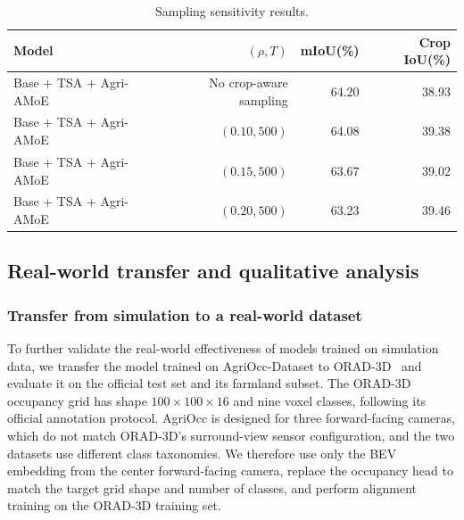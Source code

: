 \documentclass[a4paper,fleqn]{cas-sc}
\begin{document}
\begin{table}[pos=htbp]
\centering
\caption{Sampling sensitivity results.}
\label{tab:sampling}
\begin{tabular}{lrrr}
\toprule
Model & $(\rho,T)$ & mIoU(\%) & Crop IoU(\%)\\
\midrule
Base + TSA + Agri-AMoE & No crop-aware sampling & 64.20 & 38.93\\
Base + TSA + Agri-AMoE & $(0.10,500)$ & 64.08 & 39.38\\
Base + TSA + Agri-AMoE & $(0.15,500)$ & 63.67 & 39.02\\
Base + TSA + Agri-AMoE & $(0.20,500)$ & 63.23 & 39.46\\
\bottomrule
\end{tabular}
\end{table}

\subsection{Real-world transfer and qualitative analysis}\label{sec:sim2real}
\subsubsection{Transfer from simulation to a real-world dataset}\label{sec:orad_transfer}
To further validate the real-world effectiveness of models trained on simulation data, we transfer the model trained on AgriOcc-Dataset to ORAD-3D~\citep{chen2025orad3d} and evaluate it on the official test set and its farmland subset.
The ORAD-3D occupancy grid has shape $100\times100\times16$ and nine voxel classes, following its official annotation protocol.
AgriOcc is designed for three forward-facing cameras, which do not match ORAD-3D's surround-view sensor configuration, and the two datasets use different class taxonomies.
We therefore use only the BEV embedding from the center forward-facing camera, replace the occupancy head to match the target grid shape and number of classes, and perform alignment training on the ORAD-3D training set.
\end{document}
